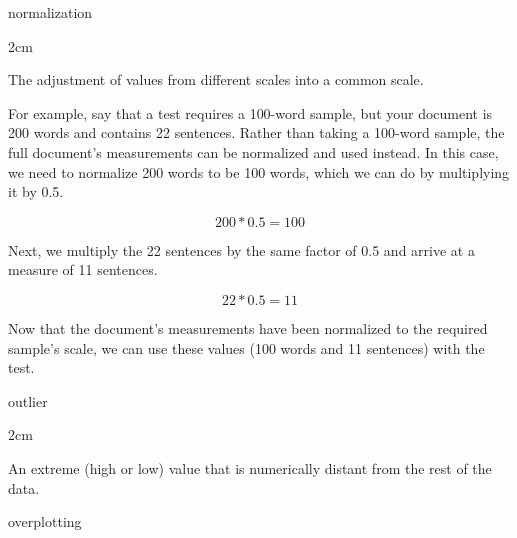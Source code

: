 \documentclass[
]{book}
\newenvironment{glsentry}
  {
  \begin{minipage}{\textwidth}
  }
  {
  \end{minipage}
  }
\newenvironment{glsterm}
  {
  \bfseries
  }
  {
  }
\newenvironment{glsdef}
  {
  \noindent
  \flushleft
  \begin{adjustwidth}{2cm}{}
  }
  {
  \end{adjustwidth}
  }
\theoremstyle{definition}
\theoremstyle{definition}
\theoremstyle{definition}
\theoremstyle{definition}
\theoremstyle{remark}
\begin{document}
\begin{glsentry}

\begin{glsterm}
normalization

\end{glsterm}

\begin{glsdef}
The adjustment of values from different scales into a common scale.

For example, say that a test requires a 100-word sample, but your document is 200 words and contains 22 sentences. Rather than taking a 100-word sample, the full document's measurements can be normalized and used instead. In this case, we need to normalize 200 words to be 100 words, which we can do by multiplying it by 0.5.

\[
200 * 0.5 = 100
\]

Next, we multiply the 22 sentences by the same factor of 0.5 and arrive at a measure of 11 sentences.

\[
22 * 0.5 = 11
\]

Now that the document's measurements have been normalized to the required sample's scale, we can use these values (100 words and 11 sentences) with the test.

\end{glsdef}

\end{glsentry}

\begin{glsentry}

\begin{glsterm}
outlier

\end{glsterm}

\begin{glsdef}
An extreme (high or low) value that is numerically distant from the rest of the data.

\end{glsdef}

\end{glsentry}

\begin{glsterm}
overplotting

\end{glsterm}
\end{document}
